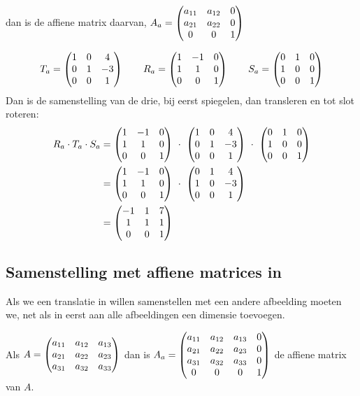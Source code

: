 {dan is de affiene matrix daarvan, $A_a = \begin{pmatrix} a_{11} & a_{12} & 0 \\ a_{21} & a_{22} & 0 \\ 0 & 0 & 1 \end{pmatrix} $}

\newpage
{}
\[
    T_a = \begin{pmatrix} 1&0&4 \\ 0&1&-3 \\ 0&0&1 \end{pmatrix} \qquad 
    R_a = \begin{pmatrix} 1&-1&0 \\ 1&1&0 \\ 0&0&1 \end{pmatrix} \qquad
    S_a = \begin{pmatrix} 0&1&0 \\ 1&0&0 \\ 0&0&1 \end{pmatrix}
\]
Dan is de samenstelling van de drie, bij eerst spiegelen, dan transleren en tot slot roteren:
\begin{align*} 
    R_a \cdot T_a \cdot S_a & = \matdrie{1&-1&0}{1&1&0}{0&0&1} \ \cdot\ 
                                \matdrie{1&0&4}{0&1&-3}{0&0&1} \ \cdot\ 
                                \matdrie{0&1&0}{1&0&0}{0&0&1} \\
       &= \matdrie{1&-1&0}{1&1&0}{0&0&1} \ \cdot\ \matdrie{0&1&4}{1&0&-3}{0&0&1} \\
       &= \matdrie{-1&1&7}{1&1&1}{0&0&1}   
\end{align*} 

\subsection{Samenstelling met affiene matrices in \RD}
Als we een translatie in \RD willen samenstellen met een andere afbeelding moeten we, net als in \RT eerst aan alle afbeeldingen een dimensie toevoegen. 

\mydeftekst{affiene matrix} {
	Als $A = \begin{pmatrix} a_{11}&a_{12}&a_{13} \\ a_{21}&a_{22}& a_{23} \\ a_{31}&a_{32}&a_{33} \end{pmatrix} $ 
	dan is $A_a = \begin{pmatrix} a_{11}&a_{12}&a_{13}&0 \\ a_{21}&a_{22}&a_{23}&0 \\ a_{31}&a_{32}&a_{33}&0 \\ 0&0&0&1 \end{pmatrix} $ de affiene matrix van $A$. 
} 
                        
